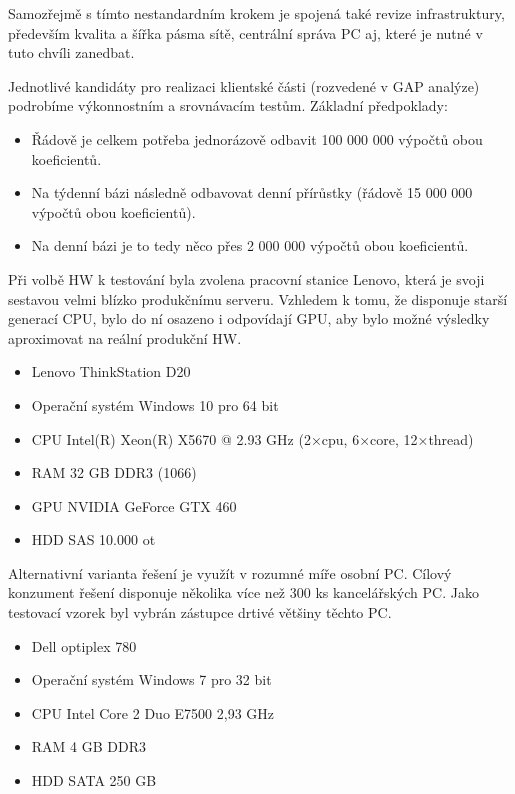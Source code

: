 Samozřejmě s tímto nestandardním krokem je spojená také revize infrastruktury, především kvalita a šířka pásma sítě, centrální správa PC aj, které je nutné v tuto chvíli zanedbat.

Jednotlivé kandidáty pro realizaci klientské části (rozvedené v GAP analýze) podrobíme výkonnostním a srovnávacím testům.
Základní předpoklady:
\begin{itemize}
	\setlength{\parskip}{0pt}
	\setlength{\itemsep}{0pt}
	\item {Řádově je celkem potřeba jednorázově odbavit 100 000 000 výpočtů obou koeficientů.}
	\item {Na týdenní bázi následně odbavovat denní přírůstky (řádově 15 000 000 výpočtů obou koeficientů).}
	\item {Na denní bázi je to tedy něco přes 2 000 000 výpočtů obou koeficientů.}
\end{itemize}



Při volbě HW k testování byla zvolena pracovní stanice Lenovo, která je svoji sestavou velmi blízko produkčnímu serveru. Vzhledem k tomu, že disponuje starší generací CPU, bylo do ní osazeno i odpovídají GPU, aby bylo možné výsledky aproximovat na reální produkční HW.
\begin{itemize}
	\setlength{\parskip}{0pt}
	\setlength{\itemsep}{0pt}
	\item {Lenovo ThinkStation D20}
	\item {Operační systém Windows 10 pro 64 bit}
    \item {CPU Intel(R) Xeon(R) X5670 @ 2.93 GHz (2×cpu, 6×core, 12×thread)}
    \item {RAM 32 GB DDR3 (1066)}
    \item {GPU NVIDIA GeForce GTX 460}
    \item {HDD SAS 10.000 ot}
\end{itemize}

Alternativní varianta řešení je využít v rozumné míře osobní PC. Cílový konzument řešení disponuje několika více než 300 ks kancelářských PC. Jako testovací vzorek byl vybrán zástupce drtivé většiny těchto PC.
\begin{itemize}
	\setlength{\parskip}{0pt}
	\setlength{\itemsep}{0pt}
	\item {Dell optiplex 780}
	\item {Operační systém Windows 7 pro 32 bit}
	\item {CPU Intel Core 2 Duo E7500 2,93 GHz}
	\item {RAM 4 GB DDR3}
	\item {HDD SATA 250 GB}
\end{itemize}


